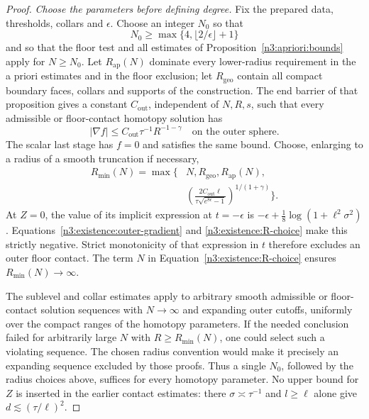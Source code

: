 \begin{proof}
\emph{Choose the parameters before defining degree.}
Fix the prepared data, thresholds, collars and $\epsilon$.
Choose an integer $N_0$ so that
\begin{equation}\label{n3:existence:n-choice}
 N_0\ge\max\{4,\lfloor2/\epsilon\rfloor+1\}
\end{equation}
and so that the floor test and all estimates of
Proposition~\ref{n3:apriori:bounds} apply for $N\ge N_0$.
Let $R_{\mathrm{ap}}(N)$ dominate every lower-radius requirement
in the a priori estimates and in the floor exclusion; let
$R_{\mathrm{geo}}$ contain all compact boundary faces, collars and
supports of the construction.  The end barrier of
that proposition gives a constant $C_{\mathrm{out}}$, independent
of $N,R,s$, such that every admissible or floor-contact homotopy
solution has
\begin{equation}\label{n3:existence:outer-gradient}
 |\nabla f|\le
       C_{\mathrm{out}}\tau^{-1}R^{-1-\gamma}
       \quad\text{on the outer sphere}.
\end{equation}
The scalar last stage has $f=0$ and satisfies the same bound.
Choose, enlarging to a radius of a smooth truncation if necessary,
\begin{equation}\label{n3:existence:R-choice}
 \begin{split}
 R_{\min}(N)=\max\biggl\{&N,R_{\mathrm{geo}},R_{\mathrm{ap}}(N),\\
 &\left(\frac{2C_{\mathrm{out}}\ell}
               {\tau\sqrt{e^{8\epsilon}-1}}
        \right)^{1/(1+\gamma)}\biggr\}.
 \end{split}
\end{equation}
At $Z=0$, the value of its implicit expression at $t=-\epsilon$
is $-\epsilon+\frac18\log(1+\ell^2\sigma^2)$.
Equations~\eqref{n3:existence:outer-gradient} and
\eqref{n3:existence:R-choice} make this strictly negative.  Strict
monotonicity of that expression in $t$ therefore excludes an outer
floor contact.  The term $N$ in Equation~\eqref{n3:existence:R-choice}
ensures $R_{\min}(N)\to\infty$.

The sublevel and collar estimates apply to arbitrary smooth
admissible or floor-contact solution sequences with $N\to\infty$
and expanding outer cutoffs, uniformly over the compact ranges of
the homotopy parameters.  If the needed conclusion failed for
arbitrarily large $N$ with $R\ge R_{\min}(N)$, one could select
such a violating sequence.  The chosen radius convention would
make it precisely an expanding sequence excluded by those proofs.
Thus a single $N_0$, followed by the radius choices above, suffices
for every homotopy parameter.  No upper bound for $Z$ is inserted
in the earlier contact estimates: there $\sigma\asymp\tau^{-1}$
and $l\ge\ell$ alone give $d\lesssim(\tau/\ell)^2$.


\end{proof}
